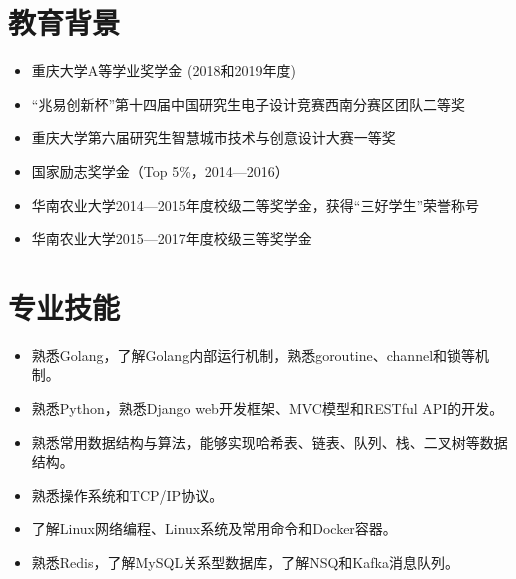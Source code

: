 \documentclass{resume}
\begin{document}




\section{教育背景}
\begin{itemize}
  \item 重庆大学A等学业奖学金 (2018和2019年度)
  \item “兆易创新杯”第十四届中国研究生电子设计竞赛西南分赛区团队二等奖
  \item 重庆大学第六届研究生智慧城市技术与创意设计大赛一等奖
\end{itemize}
\begin{itemize}
  \item 国家励志奖学金（Top 5\%，2014—2016）
  \item 华南农业大学2014—2015年度校级二等奖学金，获得“三好学生”荣誉称号
  \item 华南农业大学2015—2017年度校级三等奖学金
\end{itemize}

\section{专业技能}
\begin{itemize}[parsep=0.2ex]
  \item 熟悉Golang，了解Golang内部运行机制，熟悉goroutine、channel和锁等机制。
  \item 熟悉Python，熟悉Django web开发框架、MVC模型和RESTful API的开发。
  \item 熟悉常用数据结构与算法，能够实现哈希表、链表、队列、栈、二叉树等数据结构。
  \item 熟悉操作系统和TCP/IP协议。
  \item 了解Linux网络编程、Linux系统及常用命令和Docker容器。
  \item 熟悉Redis，了解MySQL关系型数据库，了解NSQ和Kafka消息队列。
\end{itemize}
\end{document}
